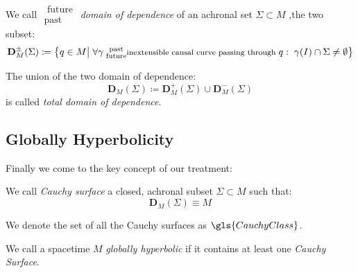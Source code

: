 \documentclass[Main]{subfiles}
\begin{document}
			\begin{definition}
				We call \emph{$\substack{\textrm{ future}\\ \textrm{past } } $ domain of dependence} of an achronal set  $\Sigma \subset M$ ,the two subset:
				\begin{displaymath}		
					\mathbf{D}_M^\pm(\Sigma) \coloneqq \big\{ q \in M \big\vert \; \forall \gamma \substack{\textrm{ past}\\ \textrm{ future} }\textrm{\footnotesize inextensible causal curve passing through }q : \; \gamma(I) \cap \Sigma \neq \emptyset  \big\}
				\end{displaymath}		
			\end{definition}
			The union of the two domain of dependence:
			$$\mathbf{D}_M(\Sigma)  \coloneqq \mathbf{D}_M^+(\Sigma) \cup \mathbf{D}_M^-(\Sigma)$$ 
			is called \emph{total domain of dependence}.
		
		\subsection{Globally Hyperbolicity}
			Finally we come to the key concept of our treatment:
			
			\begin{definition}
				We call \emph{Cauchy surface} a closed, achronal subset $\Sigma \subset M$ such that:
				\begin{displaymath}
					\mathbf{D}_M(\Sigma) \equiv M
				\end{displaymath}
			\end{definition}
				We denote the set of all the Cauchy surfaces as $\gls{CauchyClass}$.
		\begin{definition}\label{Def:GHSP}
			We call a spacetime $M$ \emph{globally hyperbolic} if it contains at least one \emph{Cauchy Surface}.
		\end{definition}
\end{document}

